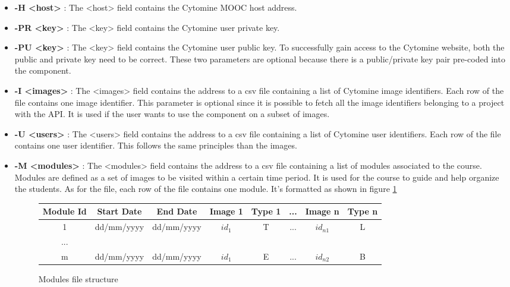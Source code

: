\documentclass[a4paper,11pt]{report}
\numberwithin{figure}{chapter} %
\begin{document}
        \begin{itemize}
            \item[\textbullet] \textbf{-H <host>} : The <host> field contains the Cytomine MOOC host address.
            \item[\textbullet] \textbf{-PR <key>} : The <key> field contains the Cytomine user private key.
            \item[\textbullet] \textbf{-PU <key>} : The <key> field contains the Cytomine user public key.
            To successfully gain access to the Cytomine website, both the public and private key need to be correct.
            These two parameters are optional because there is a public/private key pair pre-coded into the component.
            \item[\textbullet] \textbf{-I <images>} : The <images> field contains the address to a csv file containing a list of Cytomine image identifiers.
            Each row of the file contains one image identifier.
            This parameter is optional since it is possible to fetch all the image identifiers belonging to a project with the API.
            It is used if the user wants to use the component on a subset of images.
            \item[\textbullet] \textbf{-U <users>} : The <users> field contains the address to a csv file containing a list of Cytomine user identifiers.
            Each row of the file contains one user identifier.
            This follows the same principles than the images.
            \item[\textbullet] \textbf{-M <modules>} : The <modules> field contains the address to a csv file containing a list of modules associated to the course.
            Modules are defined as a set of images to be visited within a certain time period.
            It is used for the course to guide and help organize the students.
            As for the file, each row of the file contains one module.
            It's formatted as shown in figure \ref{fig:moddd}
            \begin{figure}[H]
              \begin{tabular}{| c | c | c | c | c | c | c | c |}
              \hline
              \tiny{Module Id} & \tiny{Start Date} & \tiny{End Date} & \tiny{Image 1} & \tiny{Type 1} & \tiny{...} & \tiny{Image n} & \tiny{Type n}\\ \hline
              \tiny{1} & \tiny{dd/mm/yyyy} & \tiny{dd/mm/yyyy} & \tiny{$id_1$} & \tiny{T} & \tiny{...} & \tiny{$id_{n1}$} & \tiny{L}\\ \hline
              \tiny{...} & & & & & & & \\ \hline
              \tiny{m} & \tiny{dd/mm/yyyy} & \tiny{dd/mm/yyyy} & \tiny{$id_1$} & \tiny{E} & \tiny{...} & \tiny{$id_{n2}$} & \tiny{B}\\ \hline
              \end{tabular}
              \caption{Modules file structure}
              \label{fig:moddd}
            \end{figure}



\end{itemize}
\end{document}
